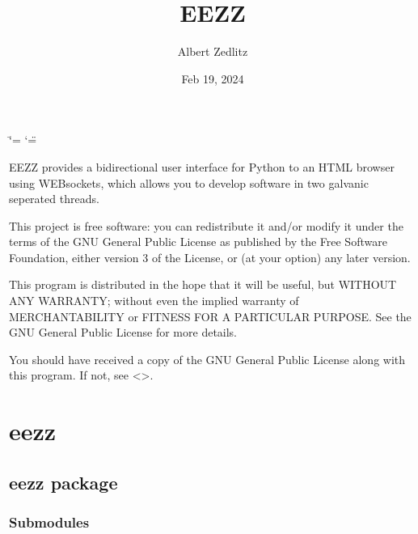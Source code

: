 \documentclass[letterpaper,10pt,english]{sphinxmanual}
\title{EEZZ}
\date{Feb 19, 2024}
\author{Albert Zedlitz}
\begin{document}
\ifdefined\shorthandoff
  \ifnum\catcode`\=\string=\active\shorthandoff{=}\fi
  \ifnum\catcode`\"=\active{}\fi
\fi

\pagestyle{empty}
\sphinxmaketitle
\pagestyle{plain}
\sphinxtableofcontents
\pagestyle{normal}
\label{\detokenize{index::doc}}


\sphinxAtStartPar
EEZZ provides a bidirectional user interface for Python to an HTML browser using
WEB\sphinxhyphen{}sockets, which allows you to develop software in two galvanic seperated threads.

\sphinxAtStartPar
This project is free software: you can redistribute it and/or modify
it under the terms of the GNU General Public License as published by
the Free Software Foundation, either version 3 of the License, or
(at your option) any later version.

\sphinxAtStartPar
This program is distributed in the hope that it will be useful,
but WITHOUT ANY WARRANTY; without even the implied warranty of
MERCHANTABILITY or FITNESS FOR A PARTICULAR PURPOSE.  See the
GNU General Public License for more details.

\sphinxAtStartPar
You should have received a copy of the GNU General Public License
along with this program.  If not, see \textless{}\textgreater{}.

\sphinxstepscope


\chapter{eezz}
\label{\detokenize{modules:eezz}}\label{\detokenize{modules::doc}}
\sphinxstepscope


\section{eezz package}
\label{\detokenize{eezz:eezz-package}}\label{\detokenize{eezz::doc}}

\subsection{Submodules}
\label{\detokenize{eezz:submodules}}
\end{document}
